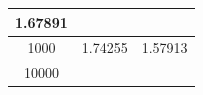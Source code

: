 \documentclass[10pt,a4paper]{article} %
\begin{document}
\begin{center}
\begin{tabular}{ c| c| c}
                                                                                                                                                                                                                                                                                                                                                                                                                                                                                            1.67891 \\ \hline
                                                                                                                                                                                                                                                                                                                                                                                                                                                                                                        1000&
                                                                                                                                                                                                                                                                                                                                                                                                                                                                                                        1.74255 &
                                                                                                                                                                                                                                                                                                                                                                                                                                                                                                        1.57913 \\
                                                                                                                                                                                                                                                                                                                                                                                                                                                                                                        \hline
                                                                                                                                                                                                                                                                                                                                                                                                                                                                                                                    10000&

\end{tabular}
\end{center}
\end{document}
